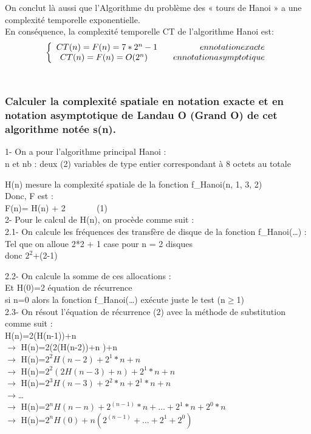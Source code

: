 \documentclass[12pt]{article}
\begin{document}
On conclut là aussi que l'Algorithme du problème des « tours de Hanoi » a une complexité temporelle exponentielle.\\

En conséquence, la complexité temporelle CT de l'algorithme Hanoi est: \\

  \[ 
\left\{
\begin{array}{r c l}
CT(n)=F(n)=7*2^n-1 \quad \quad \quad \quad \quad en notation exacte\\
CT(n)=F(n)= O(2^n)\quad \quad \quad en notation asymptotique
\end{array}
\right.
\]
\\




\subsubsection{Calculer la complexité spatiale en notation exacte et en notation asymptotique de Landau O (Grand O) de  cet  algorithme notée s(n).}
 
1- On a pour l'algorithme principal Hanoi : \\
n et nb : deux (2) variables de type entier
correspondant à 8 octets au totale 

H(n) mesure la complexité spatiale de la fonction f\_Hanoi(n, 1, 3, 2)\\

Donc, F est :\\
F(n)= H(n) + 2	$\quad \quad \quad $		(1)\\

2- Pour le calcul de H(n), on procède comme suit :\\
2.1- On calcule les fréquences des transfère de disque de la fonction f\_Hanoi(…) :\\

Tel que on alloue 2*2 + 1 case pour n = 2 disques\\
donc $2^2$+(2-1)

2.2- On calcule la somme de ces allocations :\\

Et H(0)=2	équation de récurrence \\
si n=0 alors la fonction f\_Hanoi(…) exécute juste le test (n$\ge$1)\\

2.3- On résout l'équation de récurrence (2) avec la méthode de substitution comme suit :\\
H(n)=2(H(n-1))+n           \\ 
$\rightarrow$ H(n)=2(2(H(n-2))+n )+n   \\          
$\rightarrow$ H(n)=$2^2 H(n-2)+2^1*n+n $  \\   
$\rightarrow$ H(n)=$2^2 (2H(n-3)+n)+2^1*n+n $ \\          
$\rightarrow$ H(n)=$2^3 H(n-3)+2^2*n+2^1*n+n $\\
$\rightarrow$…\\
$\rightarrow$ H(n)=$2^n H(n-n) + 2^(n-1)*n+…+2^1*n+2^0*n$\\
$\rightarrow$ H(n)=$2^n H(0)  + n(2^(n-1)+…+2^1+2^0)$\\
\end{document}
